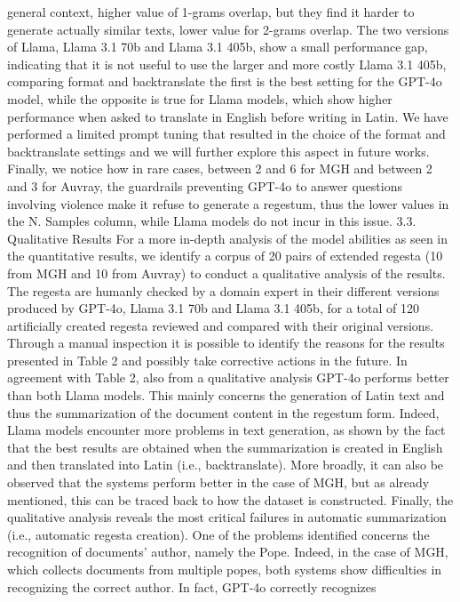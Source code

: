{general context, higher value of 1-grams overlap, but they find it harder to generate actually similar
texts, lower value for 2-grams overlap.
The two versions of Llama, Llama 3.1 70b and Llama 3.1 405b, show a small performance gap,
indicating that it is not useful to use the larger and more costly Llama 3.1 405b, comparing format and
backtranslate the first is the best setting for the GPT-4o model, while the opposite is true for Llama
models, which show higher performance when asked to translate in English before writing in Latin.
We have performed a limited prompt tuning that resulted in the choice of the format and backtranslate
settings and we will further explore this aspect in future works.
Finally, we notice how in rare cases, between 2 and 6 for MGH and between 2 and 3 for Auvray,
the guardrails preventing GPT-4o to answer questions involving violence make it refuse to generate a
regestum, thus the lower values in the N. Samples column, while Llama models do not incur in this issue.
3.3. Qualitative Results
For a more in-depth analysis of the model abilities as seen in the quantitative results, we identify a
corpus of 20 pairs of extended regesta (10 from MGH and 10 from Auvray) to conduct a qualitative
analysis of the results. The regesta are humanly checked by a domain expert in their different versions
produced by GPT-4o, Llama 3.1 70b and Llama 3.1 405b, for a total of 120 artificially created regesta
reviewed and compared with their original versions. Through a manual inspection it is possible to
identify the reasons for the results presented in Table 2 and possibly take corrective actions in the
future.
In agreement with Table 2, also from a qualitative analysis GPT-4o performs better than both Llama
models. This mainly concerns the generation of Latin text and thus the summarization of the document
content in the regestum form. Indeed, Llama models encounter more problems in text generation, as
shown by the fact that the best results are obtained when the summarization is created in English and
then translated into Latin (i.e., backtranslate). More broadly, it can also be observed that the systems
perform better in the case of MGH, but as already mentioned, this can be traced back to how the dataset
is constructed.
Finally, the qualitative analysis reveals the most critical failures in automatic summarization (i.e.,
automatic regesta creation). One of the problems identified concerns the recognition of documents’
author, namely the Pope. Indeed, in the case of MGH, which collects documents from multiple popes,
both systems show difficulties in recognizing the correct author. In fact, GPT-4o correctly recognizes
}

